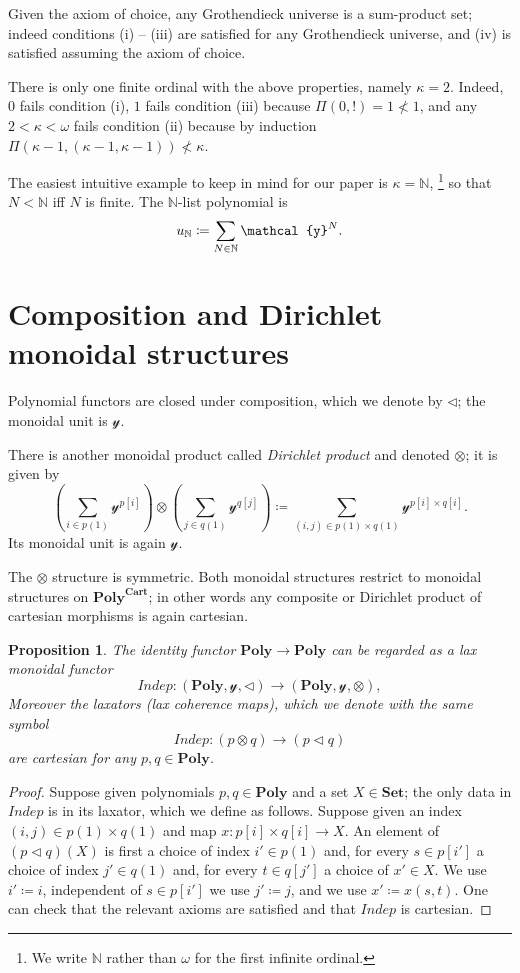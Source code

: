 \documentclass[11pt, one side, article]{memoir}
\theoremstyle{definition}
\theoremstyle{plain}
\newtheorem{proposition}[definitionx]{Proposition}
\newenvironment{example}
  {\pushQED{\qed}\renewcommand{\qedsymbol}{$\lozenge$}\examplex}
  {\popQED\endexamplex}
\newcommand{\Cat}[1]{\mathbf{#1}}%
\newcommand{\Fun}[1]{\mathit{#1}}%
\newcommand{\nn}{\mathbb{N}}
\newcommand{\smset}{\Cat{Set}}
\newcommand{\yon}{\mathcal{y}}
\newcommand{\poly}{\Cat{Poly}}
\newcommand{\polycart}{\poly^{\Cat{Cart}}}
\newcommand{\0}{\textsf{0}}
\newcommand{\1}{\tn{\textsf{1}}}
\newcommand{\tri}{\mathbin{\triangleleft}}
\newcommand{\indep}{\Fun{Indep}}
\begin{document}
\begin{example}\label{ex.sum_prod_set}
Given the axiom of choice, any Grothendieck universe is a sum-product set; indeed conditions (i) -- (iii) are satisfied for any Grothendieck universe, and (iv) is satisfied assuming the axiom of choice.

There is only one finite ordinal with the above properties, namely $\kappa=2$. Indeed, $0$ fails condition (i), $1$ fails condition (iii) because $\Pi(0,!)=1\not<1$, and any $2<\kappa<\omega$ fails condition (ii) because by induction $\Pi(\kappa-1,(\kappa-1,\kappa-1))\not<\kappa$.

The easiest intuitive example to keep in mind for our paper is $\kappa=\nn$,%
\footnote{We write $\nn$ rather than $\omega$ for the first infinite ordinal.} so that $N<\nn$ iff $N$ is finite. The $\nn$-list polynomial is
\[
  u_\nn\coloneqq\sum_{N\in\nn}\yon^N.
\qedhere
\]
\end{example}

\section{Composition and Dirichlet monoidal structures}

Polynomial functors are closed under composition, which we denote by $\tri$; the monoidal unit is $\yon$.

There is another monoidal product called \emph{Dirichlet product} and denoted $\otimes$; it is given by
\[
\left(\sum_{i\in p(1)}\yon^{p[i]}\right)\otimes
\left(\sum_{j\in q(1)}\yon^{q[j]}\right)\coloneqq
\sum_{(i,j)\in p(1)\times q(1)}\yon^{p[i]\times q[i]}.
\]
Its monoidal unit is again $\yon$. 

The $\otimes$ structure is symmetric. Both monoidal structures restrict to monoidal structures on $\polycart$; in other words any composite or Dirichlet product of cartesian morphisms is again cartesian.

\begin{proposition}\label{prop.indep}
The identity functor $\poly\to\poly$ can be regarded as a lax monoidal functor
\begin{equation}\label{eqn.indep}
	\indep\colon (\poly,\yon,\tri)\to(\poly,\yon,\otimes),
\end{equation}
Moreover the laxators (lax coherence maps), which we denote with the same symbol
\[\indep\colon (p\otimes q)\to (p\tri q)\]
are cartesian for any $p,q\in\poly$.
\end{proposition}
\begin{proof}
Suppose given polynomials $p,q\in\poly$ and a set $X\in\smset$; the only data in $\indep$ is in its laxator, which we define as follows. Suppose given an index $(i,j)\in p(1)\times q(1)$ and map $x\colon p[i]\times q[i]\to X$. An element of $(p\tri q)(X)$ is first a choice of index $i'\in p(1)$ and, for every $s\in p[i']$ a choice of index $j'\in q(1)$ and, for every $t\in q[j']$ a choice of $x'\in X$. We use $i'\coloneqq i$, independent of $s\in p[i']$ we use $j'\coloneqq j$, and we use $x'\coloneqq x(s,t)$. One can check that the relevant axioms are satisfied and that $\indep$ is cartesian.
\end{proof}
\end{document}
